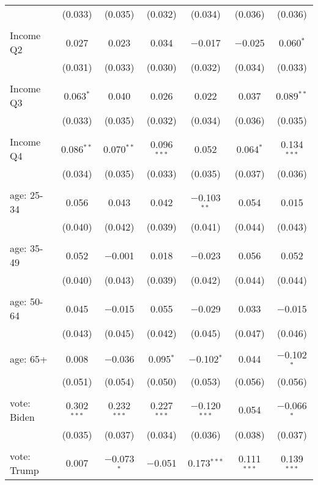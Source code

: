 \begin{tabular}{@{\extracolsep{5pt}}lcccccc}
  & (0.033) & (0.035) & (0.032) & (0.034) & (0.036) & (0.036) \\ 
  & & & & & & \\ 
 Income Q2 & 0.027 & 0.023 & 0.034 & $-$0.017 & $-$0.025 & 0.060$^{*}$ \\ 
  & (0.031) & (0.033) & (0.030) & (0.032) & (0.034) & (0.033) \\ 
  & & & & & & \\ 
 Income Q3 & 0.063$^{*}$ & 0.040 & 0.026 & 0.022 & 0.037 & 0.089$^{**}$ \\ 
  & (0.033) & (0.035) & (0.032) & (0.034) & (0.036) & (0.035) \\ 
  & & & & & & \\ 
 Income Q4 & 0.086$^{**}$ & 0.070$^{**}$ & 0.096$^{***}$ & 0.052 & 0.064$^{*}$ & 0.134$^{***}$ \\ 
  & (0.034) & (0.035) & (0.033) & (0.035) & (0.037) & (0.036) \\ 
  & & & & & & \\ 
 age: 25-34 & 0.056 & 0.043 & 0.042 & $-$0.103$^{**}$ & 0.054 & 0.015 \\ 
  & (0.040) & (0.042) & (0.039) & (0.041) & (0.044) & (0.043) \\ 
  & & & & & & \\ 
 age: 35-49 & 0.052 & $-$0.001 & 0.018 & $-$0.023 & 0.056 & 0.052 \\ 
  & (0.040) & (0.043) & (0.039) & (0.042) & (0.044) & (0.044) \\ 
  & & & & & & \\ 
 age: 50-64 & 0.045 & $-$0.015 & 0.055 & $-$0.029 & 0.033 & $-$0.015 \\ 
  & (0.043) & (0.045) & (0.042) & (0.045) & (0.047) & (0.046) \\ 
  & & & & & & \\ 
 age: 65+ & 0.008 & $-$0.036 & 0.095$^{*}$ & $-$0.102$^{*}$ & 0.044 & $-$0.102$^{*}$ \\ 
  & (0.051) & (0.054) & (0.050) & (0.053) & (0.056) & (0.056) \\ 
  & & & & & & \\ 
 vote: Biden & 0.302$^{***}$ & 0.232$^{***}$ & 0.227$^{***}$ & $-$0.120$^{***}$ & 0.054 & $-$0.066$^{*}$ \\ 
  & (0.035) & (0.037) & (0.034) & (0.036) & (0.038) & (0.037) \\ 
  & & & & & & \\ 
 vote: Trump & 0.007 & $-$0.073$^{*}$ & $-$0.051 & 0.173$^{***}$ & 0.111$^{***}$ & 0.139$^{***}$ \\ 

\end{tabular}
